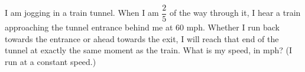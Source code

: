 I am jogging in a train tunnel. When I am $\dfrac{2}{5}$ of the way through it, I hear a train approaching the tunnel entrance behind me at $60$ mph. Whether I run back towards the entrance or ahead towards the exit, I will reach that end of the tunnel at exactly the same moment as the train. What is my speed, in mph? (I run at a constant speed.)
